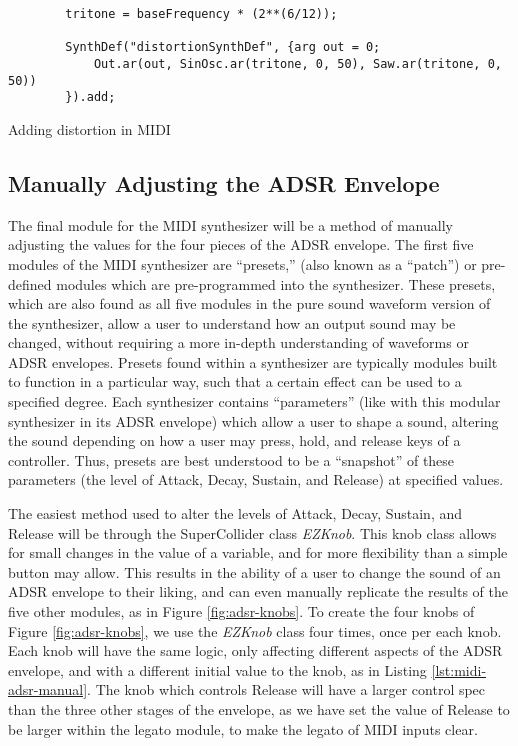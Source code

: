 \begin{listing}
	\begin{lstlisting}
		tritone = baseFrequency * (2**(6/12));
			
		SynthDef("distortionSynthDef", {arg out = 0;
			Out.ar(out, SinOsc.ar(tritone, 0, 50), Saw.ar(tritone, 0, 50))
		}).add;
	\end{lstlisting}
	\caption{Adding distortion in MIDI}
	\label{lst:midi-distortion}
\end{listing}


\subsection{Manually Adjusting the ADSR Envelope}

The final module for the MIDI synthesizer will be a method of manually adjusting the values for the four pieces of the ADSR envelope. The first five modules of the MIDI synthesizer are ``presets,'' (also known as a ``patch'') or pre-defined modules which are pre-programmed into the synthesizer. These presets, which are also found as all five modules in the pure sound waveform version of the synthesizer, allow a user to understand how an output sound may be changed, without requiring a more in-depth understanding of waveforms or ADSR envelopes. Presets found within a synthesizer are typically modules built to function in a particular way, such that a certain effect can be used to a specified degree. Each synthesizer contains ``parameters'' (like with this modular synthesizer in its ADSR envelope) which allow a user to shape a sound, altering the sound depending on how a user may press, hold, and release keys of a controller. Thus, presets are best understood to be a ``snapshot'' of these parameters (the level of Attack, Decay, Sustain, and Release) at specified values.

The easiest method used to alter the levels of Attack, Decay, Sustain, and Release will be through the SuperCollider class \textit{EZKnob}. This knob class allows for small changes in the value of a variable, and for more flexibility than a simple button may allow. This results in the ability of a user to change the sound of an ADSR envelope to their liking, and can even manually replicate the results of the five other modules, as in Figure \ref{fig:adsr-knobs}. To create the four knobs of Figure \ref{fig:adsr-knobs}, we use the \textit{EZKnob} class four times, once per each knob. Each knob will have the same logic, only affecting different aspects of the ADSR envelope, and with a different initial value to the knob, as in Listing \ref{lst:midi-adsr-manual}. The knob which controls Release will have a larger control spec than the three other stages of the envelope, as we have set the value of Release to be larger within the legato module, to make the legato of MIDI inputs clear.

